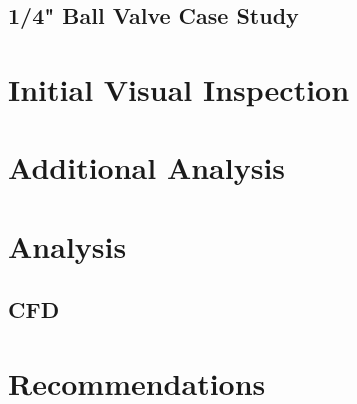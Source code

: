 \documentclass[]{article}
\begin{document}
\subsection{1/4" Ball Valve Case Study}



\section{Initial Visual Inspection}


\section{Additional Analysis}

\section{Analysis}
\subsection{CFD}

\section{Recommendations}
\end{document}
